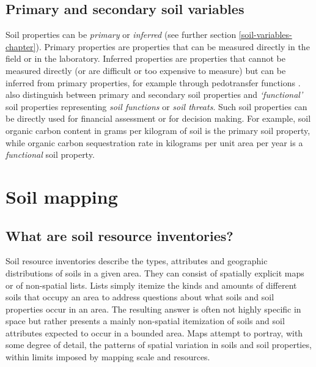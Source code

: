 \documentclass[11pt]{krantz}
\theoremstyle{definition}
\theoremstyle{definition}
\theoremstyle{definition}
\theoremstyle{remark}
\begin{document}
\hypertarget{primary-and-secondary-soil-variables}{%
\subsection{Primary and secondary soil
variables}\label{primary-and-secondary-soil-variables}}

Soil properties can be \emph{primary} or \emph{inferred} (see further
section \ref{soil-variables-chapter}). Primary properties are properties
that can be measured directly in the field or in the laboratory.
Inferred properties are properties that cannot be measured directly (or
are difficult or too expensive to measure) but can be inferred from
primary properties, for example through pedotransfer functions
\citep{Wosten2001JH, wosten2013soil}. \citet{Dobos2006digital} also
distinguish between primary and secondary soil properties and
\emph{`functional'} soil properties representing \emph{soil functions}
or \emph{soil threats}. Such soil properties can be directly used for
financial assessment or for decision making. For example, soil organic
carbon content in grams per kilogram of soil is the primary soil
property, while organic carbon sequestration rate in kilograms per unit
area per year is a \emph{functional} soil property.

\hypertarget{soil-mapping}{%
\section{Soil mapping}\label{soil-mapping}}

\hypertarget{what-are-soil-resource-inventories}{%
\subsection{What are soil resource
inventories?}\label{what-are-soil-resource-inventories}}

Soil resource inventories describe the types, attributes and geographic
distributions of soils in a given area. They can consist of spatially
explicit maps or of non-spatial lists. Lists simply itemize the kinds
and amounts of different soils that occupy an area to address questions
about what soils and soil properties occur in an area. The resulting
answer is often not highly specific in space but rather presents a
mainly non-spatial itemization of soils and soil attributes expected to
occur in a bounded area. Maps attempt to portray, with some degree of
detail, the patterns of spatial variation in soils and soil properties,
within limits imposed by mapping scale and resources.
\end{document}
